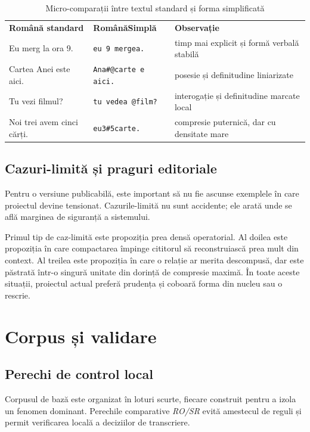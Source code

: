 \documentclass[12pt,onecolumn,letterpaper]{article}
\newcommand{\rs}[1]{\texttt{#1}}
\newcommand{\RStablelayout}{%
\footnotesize
\setlength{\tabcolsep}{6pt}%
\renewcommand{\arraystretch}{1.12}%
\arrayrulecolor{RSRule}%
}
\begin{document}
\begin{table}[h!]
\centering
\RStablelayout
\begin{tabularx}{\linewidth}{@{}Y Y Y@{}}
\textbf{Română standard} & \textbf{RomânăSimplă} & \textbf{Observație} \\
Eu merg la ora 9. & \rs{eu 9 mergea.} & timp mai explicit și formă verbală stabilă \\
Cartea Anei este aici. & \rs{Ana\#@carte e aici.} & posesie și definitudine liniarizate \\
Tu vezi filmul? & \rs{tu vedea @film?} & interogație și definitudine marcate local \\
Noi trei avem cinci cărți. & \rs{eu3\#5carte.} & compresie puternică, dar cu densitate mare \\
\bottomrule
\end{tabularx}
\caption{Micro-comparații între textul standard și forma simplificată}
\end{table}

\subsection{Cazuri-limită și praguri editoriale}

Pentru o versiune publicabilă, este important să nu fie ascunse exemplele în care
proiectul devine tensionat. Cazurile-limită nu sunt accidente; ele arată unde se
află marginea de siguranță a sistemului.

Primul tip de caz-limită este propoziția prea densă operatorial. Al doilea este
propoziția în care compactarea împinge cititorul să reconstruiască prea mult din
context. Al treilea este propoziția în care o relație ar merita descompusă, dar
este păstrată într-o singură unitate din dorință de compresie maximă. În toate
aceste situații, proiectul actual preferă prudența și coboară forma din nucleu
sau o rescrie.

\section{Corpus și validare}

\subsection{Perechi de control local}

Corpusul de bază este organizat în loturi scurte, fiecare construit pentru a
izola un fenomen dominant. Perechile comparative \textit{RO/SR} evită amestecul
de reguli și permit verificarea locală a deciziilor de transcriere.
\end{document}
